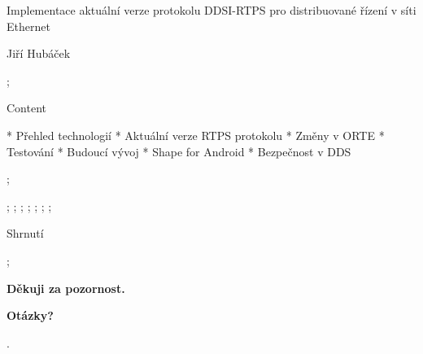 

\worktype[M/CZ]

\slideshow

\tit Implementace aktuální verze protokolu DDSI-RTPS pro distribuované řízení v síti Ethernet

\subtit Jiří Hubáček

\pg;


\sec Content

* Přehled technologií
* Aktuální verze RTPS protokolu
* Změny v ORTE
* Testování
* Budoucí vývoj
* Shape for Android
* Bezpečnost v DDS

\pg;

 \pg;
 \pg;
 \pg;
 \pg;
 \pg;
 \pg;
 \pg;


\sec Shrnutí

\pg;

\null
\vskip2cm
\centerline{\typosize[35/40]\bf Děkuji za pozornost.}

\vskip2cm
\centerline{\Blue\typosize[60/70]\bf Otázky?}

\pg.
